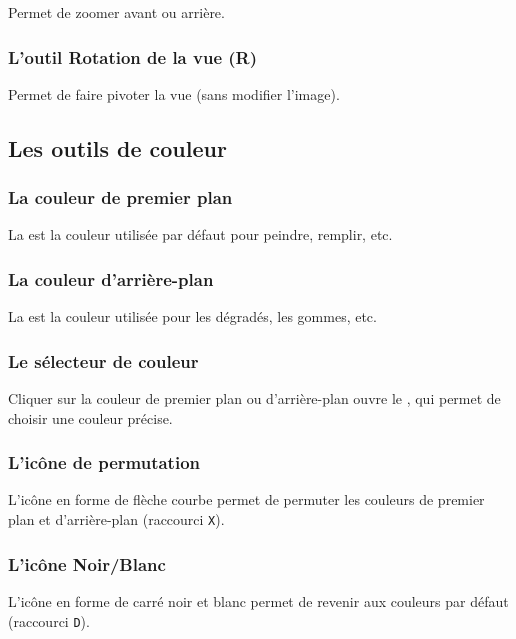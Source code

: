 Permet de zoomer avant ou arrière.

\subsubsection{L'outil Rotation de la vue (R)}

Permet de faire pivoter la vue (sans modifier l'image).

\subsection{Les outils de couleur}

\subsubsection{La couleur de premier plan}

La  est la couleur utilisée par défaut pour peindre, remplir, etc.

\subsubsection{La couleur d'arrière-plan}

La  est la couleur utilisée pour les dégradés, les gommes, etc.

\subsubsection{Le sélecteur de couleur}

Cliquer sur la couleur de premier plan ou d'arrière-plan ouvre le , qui permet de choisir une couleur précise.

\subsubsection{L'icône de permutation}

L'icône en forme de flèche courbe permet de permuter les couleurs de premier plan et d'arrière-plan (raccourci \texttt{X}).

\subsubsection{L'icône Noir/Blanc}

L'icône en forme de carré noir et blanc permet de revenir aux couleurs par défaut (raccourci \texttt{D}).


